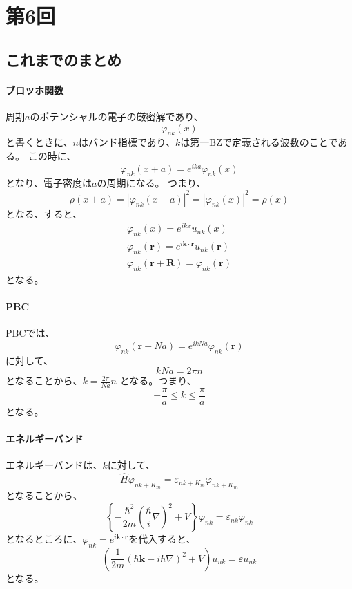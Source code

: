\documentclass[titlepage]{ltjsarticle}
\begin{document}
\section{第6回}
\subsection{これまでのまとめ}
\paragraph{ブロッホ関数}
周期\(a\)のポテンシャルの電子の厳密解であり、
\begin{equation}
  \varphi_{nk}(x)
\end{equation}
と書くときに、\(n\)はバンド指標であり、\(k\)は第一BZで定義される波数のことである。
この時に、
\begin{equation}
  \varphi_{nk}(x+a) = e^{ika}\varphi_{nk}(x)
\end{equation}
となり、電子密度は\(a\)の周期になる。
つまり、
\begin{equation}
  \rho(x+a) = |\varphi_{nk}(x+a) | ^2 = |\varphi_{nk}(x)|^2 = \rho(x)
\end{equation}
となる、すると、
\begin{align}
  \varphi_{nk}(x) = e^{ikx} u_{nk}(x) \\
  \varphi_{nk}(\bm{r}) = e^{i \bm{k}\cdot \bm{r}} u_{nk}(\bm{r})\\
  \varphi_{nk}(\bm{r}+\bm{R}) = \varphi_{nk}(\bm{r})
\end{align}
となる。

\paragraph{PBC}
PBCでは、
\begin{equation}
  \varphi_{nk}(\bm{r}+Na) = e^{ikNa}\varphi_{nk}(\bm{r})
\end{equation}
に対して、
\begin{equation}
  kNa = 2\pi n
\end{equation}
となることから、\(k=\frac{2\pi}{Na}n\)
となる。つまり、
\begin{equation}
  -\frac{\pi}{a} \le k \le \frac{\pi}{a}
\end{equation}
となる。
\paragraph{エネルギーバンド}
エネルギーバンドは、\(k\)に対して、
\begin{equation}
  \hat{H}\varphi_{nk+K_m}= \varepsilon_{nk+K_m}\varphi_{nk+K_m}
\end{equation}
となることから、
\begin{equation}
  \left\{ - \frac{\hbar^2}{2m} \left( \frac{\hbar}{i}\nabla \right)^2 + V \right\}\varphi_{nk} = \varepsilon_{nk}\varphi_{nk}
\end{equation}
となるところに、\(\varphi_{nk}=e^{i \bm{k}\cdot \bm{r}}\)を代入すると、
\begin{equation}
  \left(\frac{1}{2m}(\hbar \bm{k} - i \hbar \nabla)^2 + V\right)u_{nk} = \varepsilon u_{nk} 
\end{equation}
となる。
\end{document}
